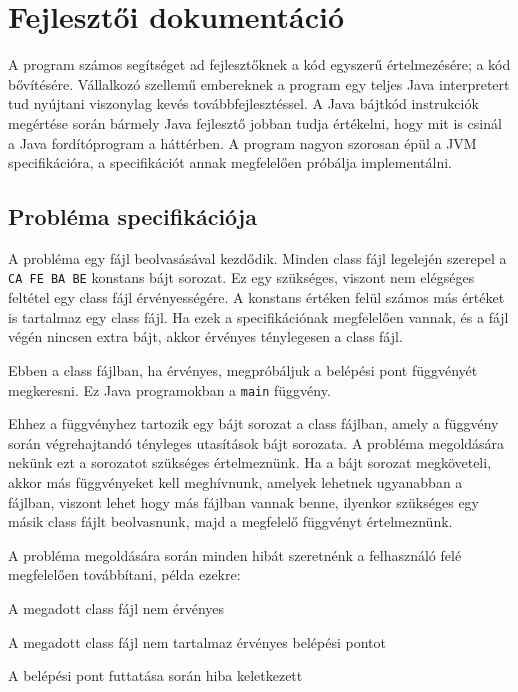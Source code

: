 \chapter{Fejlesztői dokumentáció}
\label{ch:impl}

A program számos segítséget ad fejlesztőknek a kód egyszerű értelmezésére; a kód bővítésére. Vállalkozó szellemű embereknek a program egy teljes Java interpretert tud nyújtani viszonylag kevés továbbfejlesztéssel. A Java bájtkód instrukciók megértése során bármely Java fejlesztő jobban tudja értékelni, hogy mit is csinál a Java fordítóprogram a háttérben. A program nagyon szorosan épül a JVM specifikációra, a specifikációt annak megfelelően próbálja implementálni.

\section{Probléma specifikációja}

A probléma egy fájl beolvasásával kezdődik. Minden class fájl legelején szerepel a \lstinline{CA FE BA BE} konstans bájt sorozat. Ez egy szükséges, viszont nem elégséges feltétel egy class fájl érvényességére. A konstans értéken felül számos más értéket is tartalmaz egy class fájl. Ha ezek a specifikációnak megfelelően vannak, és a fájl végén nincsen extra bájt, akkor érvényes ténylegesen a class fájl.

Ebben a class fájlban, ha érvényes, megpróbáljuk a belépési pont függvényét megkeresni. Ez Java programokban a \lstinline{main} függvény.

Ehhez a függvényhez tartozik egy bájt sorozat a class fájlban, amely a függvény során végrehajtandó tényleges utasítások bájt sorozata. A probléma megoldására nekünk ezt a sorozatot szükséges értelmeznünk. Ha a bájt sorozat megköveteli, akkor más függvényeket kell meghívnunk, amelyek lehetnek ugyanabban a fájlban, viszont lehet hogy más fájlban vannak benne, ilyenkor szükséges egy másik class fájlt beolvasnunk, majd a megfelelő függvényt értelmeznünk.

A probléma megoldására során minden hibát szeretnénk a felhasználó felé megfelelően továbbítani, példa ezekre:
\begin{compactitem}
	\item A megadott class fájl nem érvényes
	\item A megadott class fájl nem tartalmaz érvényes belépési pontot
	\item A belépési pont futtatása során hiba keletkezett
\end{compactitem}

